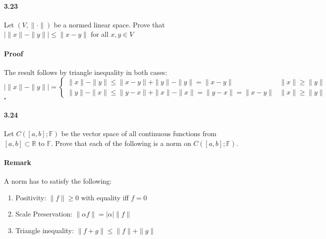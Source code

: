 \documentclass[letterpaper,12pt]{article}
\theoremstyle{definition}
\begin{document}
\paragraph{3.23} Let $(V,\|\cdot \|)$ be a normed linear space. Prove that $| \|x \| - \|y \| | \le \|x - y \|$ for all $x,y \in V$ 
\paragraph{Proof} The result follows by triangle inequality in both cases:
$$| \|x \| - \|y \| | 
= \begin{cases}
\|x \| - \|y \| \le \|x - y \| + \|y \| - \|y \| = \|x - y \| & \|x \| \ge \|y \|   \\
\|y \| - \|x \| \le \|y - x \| + \|x \| - \|x \| = \|y - x \| = \|x - y \| & \|x \| \ge \|y \| 
\end{cases}$$ $\square$



\paragraph{3.24} Let $C([a,b];\mathds{F})$ be the vector space of all continuous functions from $[a,b] \subset \mathds{R}$ to $\mathds{F}$. Prove that each of the following is a norm on $C([a,b];\mathds{F})$.

\paragraph{Remark} A norm has to satisfy the following:
\begin{enumerate}
\item  Positivity: $\|f\| \ge 0$ with equality iff $f = 0$
\item  Scale Preservation: $\|\alpha f\| = |\alpha| \|f\| $ 
\item  Triangle inequality: $\|f + g\| \le \|f \| + \|g\|$
\end{enumerate}
\end{document}

